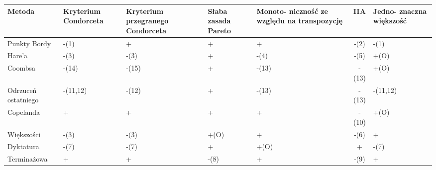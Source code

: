 \documentclass[12pt,a4paper]{article}
\theoremstyle{break}
\begin{document}
		\begin{tabular}{|p{2.5cm}|p{2cm}|p{2cm}|p{2cm}|p{2cm}|c|p{2cm}|}\hline
			Metoda & Kryterium Condorceta & Kryterium przegranego Condorceta & Słaba zasada Pareto & Monoto- niczność ze względu na transpozycję & IIA & Jedno- znaczna większość\\\hline
			Punkty Bordy   &-(1)&+&+&+&-(2)&-(1)\\\hline
			Hare'a   &-(3)&-(3)&+&-(4)&-(5)&+(O)\\\hline
			Coombsa &-(14)&-(15)&+&-(13)&-(13)&+(O)\\\hline
			Odrzuceń ostatniego &-(11,12)&-(12)&+&-(13)&-(13)&-(11,12)\\\hline
			Copelanda &+&+&+&+&-(10)&+(O)\\\hline
			Większości &-(3)&-(3)&+(O)&+&-(6)&+\\\hline
			Dyktatura &-(7)&-(7)&+&+(O)&+&-(7)\\\hline
			Terminażowa &+&+&-(8)&+&-(9)&+\\\hline
		\end{tabular}\\\\
		
\end{document}
